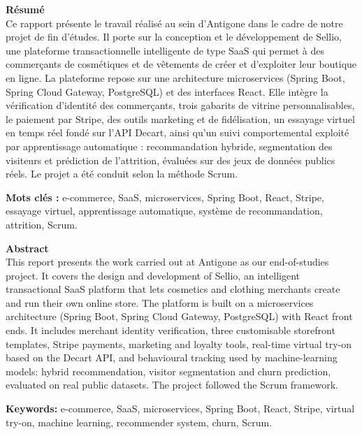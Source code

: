 \clearpage
\thispagestyle{empty}
\noindent\textbf{\large Résumé}\\[0.3cm]
Ce rapport présente le travail réalisé au sein d'Antigone dans le cadre de notre projet de fin d'études. Il porte sur la conception et le développement de Sellio, une plateforme transactionnelle intelligente de type SaaS qui permet à des commerçants de cosmétiques et de vêtements de créer et d'exploiter leur boutique en ligne. La plateforme repose sur une architecture microservices (Spring Boot, Spring Cloud Gateway, PostgreSQL) et des interfaces React. Elle intègre la vérification d'identité des commerçants, trois gabarits de vitrine personnalisables, le paiement par Stripe, des outils marketing et de fidélisation, un essayage virtuel en temps réel fondé sur l'API Decart, ainsi qu'un suivi comportemental exploité par apprentissage automatique : recommandation hybride, segmentation des visiteurs et prédiction de l'attrition, évaluées sur des jeux de données publics réels. Le projet a été conduit selon la méthode Scrum.

\vspace{0.3cm}
\noindent\textbf{Mots clés :} e-commerce, SaaS, microservices, Spring Boot, React, Stripe, essayage virtuel, apprentissage automatique, système de recommandation, attrition, Scrum.

\vspace{1.2cm}
\noindent\textbf{\large Abstract}\\[0.3cm]
This report presents the work carried out at Antigone as our end-of-studies project. It covers the design and development of Sellio, an intelligent transactional SaaS platform that lets cosmetics and clothing merchants create and run their own online store. The platform is built on a microservices architecture (Spring Boot, Spring Cloud Gateway, PostgreSQL) with React front ends. It includes merchant identity verification, three customisable storefront templates, Stripe payments, marketing and loyalty tools, real-time virtual try-on based on the Decart API, and behavioural tracking used by machine-learning models: hybrid recommendation, visitor segmentation and churn prediction, evaluated on real public datasets. The project followed the Scrum framework.

\vspace{0.3cm}
\noindent\textbf{Keywords:} e-commerce, SaaS, microservices, Spring Boot, React, Stripe, virtual try-on, machine learning, recommender system, churn, Scrum.
